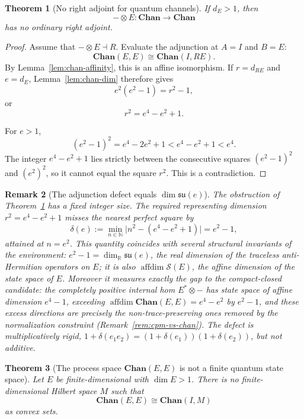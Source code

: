 \documentclass[11pt]{article}
\newtheorem{theorem}{Theorem}[section]
\newtheorem{remark}[theorem]{Remark}
\DeclareMathOperator{\affdim}{affdim}
\begin{document}
\begin{theorem}[No right adjoint for quantum channels]
\label{thm:chan-no-right}
If $d_E>1$, then
\[
-\otimes E:\mathbf{Chan}\to\mathbf{Chan}
\]
has no ordinary right adjoint.
\end{theorem}

\begin{proof}
Assume that $-\otimes E\dashv R$. Evaluate the adjunction at $A=I$ and
$B=E$:
\[
\mathbf{Chan}(E,E)\cong\mathbf{Chan}(I,RE).
\]
By Lemma~\ref{lem:chan-affinity}, this is an affine isomorphism. If
$r=d_{RE}$ and $e=d_E$, Lemma~\ref{lem:chan-dim} therefore gives
\[
e^2(e^2-1)=r^2-1,
\]
or
\[
r^2=e^4-e^2+1.
\]

For $e>1$,
\[
(e^2-1)^2=e^4-2e^2+1
<
e^4-e^2+1
<
e^4.
\]
The integer $e^4-e^2+1$ lies strictly between the consecutive squares
$(e^2-1)^2$ and $(e^2)^2$, so it cannot equal the square $r^2$. This is a
contradiction.
\end{proof}

\begin{remark}[The adjunction defect equals $\dim\mathfrak{su}(e)$]
\label{rem:adjunction-defect}
The obstruction of Theorem~\ref{thm:chan-no-right} has a fixed integer size. The
required representing dimension $r^2=e^4-e^2+1$ misses the nearest perfect square
by
\[
\delta(e):=\min_{n\in\mathbb N}\bigl|n^2-(e^4-e^2+1)\bigr|=e^2-1,
\]
attained at $n=e^2$. This quantity coincides with several structural invariants
of the environment: $e^2-1=\dim_{\mathbb R}\mathfrak{su}(e)$, the real dimension
of the traceless anti-Hermitian operators on $E$; it is also
$\affdim\mathcal S(E)$, the affine dimension of the state space of $E$. Moreover
it measures exactly the gap to the compact-closed candidate: the completely
positive internal hom $E^{*}\otimes-$ has state space of affine dimension
$e^4-1$, exceeding $\affdim\mathbf{Chan}(E,E)=e^4-e^2$ by $e^2-1$, and these
excess directions are precisely the non-trace-preserving ones removed by the
normalization constraint (Remark~\ref{rem:cpm-vs-chan}). The defect is
multiplicatively rigid, $1+\delta(e_1e_2)=(1+\delta(e_1))(1+\delta(e_2))$, but
not additive.
\end{remark}

\begin{theorem}[The process space $\mathbf{Chan}(E,E)$ is not a finite quantum state space]
\label{thm:chan-not-state-space}
Let $E$ be finite-dimensional with $\dim E>1$. There is no finite-dimensional
Hilbert space $M$ such that
\[
\mathbf{Chan}(E,E)
\cong
\mathbf{Chan}(I,M)
\]
as convex sets.
\end{theorem}
\end{document}
